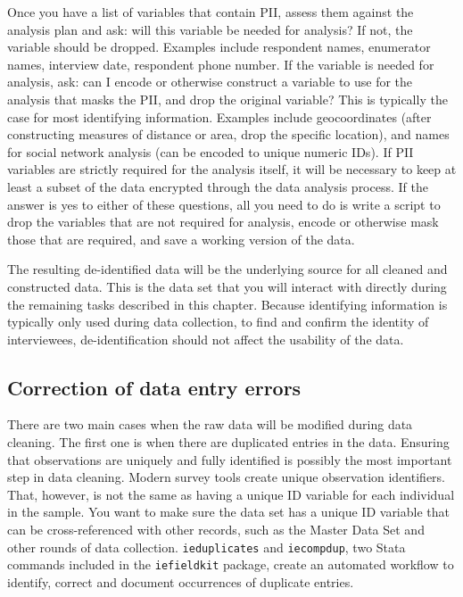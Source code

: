 Once you have a list of variables that contain PII, 
assess them against the analysis plan and ask: 
will this variable be needed for analysis?
If not, the variable should be dropped. 
Examples include respondent names, enumerator names, interview date, respondent phone number.
If the variable is needed for analysis, ask: 
can I encode or otherwise construct a variable to use for the analysis that masks the PII, 
and drop the original variable?
This is typically the case for most identifying information.
Examples include geocoordinates 
(after constructing measures of distance or area, 
drop the specific location), 
and names for social network analysis (can be encoded to unique numeric IDs).
If PII variables are strictly required for the analysis itself, 
it will be necessary to keep at least a subset of the data encrypted through the data analysis process.
If the answer is yes to either of these questions, 
all you need to do is write a script to drop the variables that are not required for analysis, 
encode or otherwise mask those that are required, 
and save a working version of the data.

The resulting de-identified data will be the underlying source for all cleaned and constructed data.
This is the data set that you will interact with directly during the remaining tasks described in this chapter.
Because identifying information is typically only used during data collection, 
to find and confirm the identity of interviewees, 
de-identification should not affect the usability of the data.

\subsection{Correction of data entry errors}

There are two main cases when the raw data will be modified during data cleaning.
The first one is when there are duplicated entries in the data.
Ensuring that observations are uniquely and fully identified
is possibly the most important step in data cleaning.
Modern survey tools create unique observation identifiers.
That, however, is not the same as having a unique ID variable for each individual in the sample.
You want to make sure the data set has a unique ID variable
that can be cross-referenced with other records, such as the Master Data Set
and other rounds of data collection.
\texttt{ieduplicates} and \texttt{iecompdup}, 
two Stata commands included in the \texttt{iefieldkit} 
package,
create an automated workflow to identify, correct and document
occurrences of duplicate entries. 


